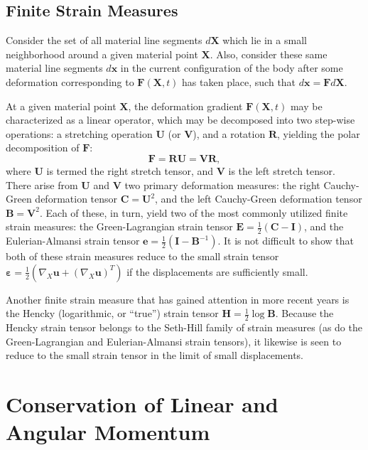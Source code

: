 \subsection{Finite Strain Measures}

Consider the set of all material line segments $d \mathbf{X}$ which lie in a small neighborhood around a given material point $\mathbf{X}$. Also, consider these same material line segments $d \mathbf{x}$ in the current configuration of the body after some deformation corresponding to $\mathbf{F} (\mathbf{X}, t)$ has taken place, such that $d \mathbf{x} = \mathbf{F} d \mathbf{X}$.

At a given material point $\mathbf{X}$, the deformation gradient $\mathbf{F} (\mathbf{X}, t)$ may be characterized as a linear operator, which may be decomposed into two step-wise operations: a stretching operation $\mathbf{U}$ (or $\mathbf{V}$), and a rotation $\mathbf{R}$, yielding the polar decomposition of $\mathbf{F}$:
\begin{equation}
  \mathbf{F} = \mathbf{R} \mathbf{U} = \mathbf{V} \mathbf{R},
\end{equation}
where $\mathbf{U}$ is termed the right stretch tensor, and $\mathbf{V}$ is the left stretch tensor. There arise from $\mathbf{U}$ and $\mathbf{V}$ two primary deformation measures: the right Cauchy-Green deformation tensor $\mathbf{C} = \mathbf{U}^2$, and the left Cauchy-Green deformation tensor $\mathbf{B} = \mathbf{V}^2$. Each of these, in turn, yield two of the most commonly utilized finite strain measures: the Green-Lagrangian strain tensor $\mathbf{E} = \frac{1}{2} (\mathbf{C} - \mathbf{I})$, and the Eulerian-Almansi strain tensor $\mathbf{e} = \frac{1}{2} (\mathbf{I} - \mathbf{B}^{-1})$. It is not difficult to show that both of these strain measures reduce to the small strain tensor $\boldsymbol{\varepsilon} = \frac{1}{2} (\nabla_X \mathbf{u} + (\nabla_X \mathbf{u})^T)$ if the displacements are sufficiently small.

Another finite strain measure that has gained attention in more recent years is the Hencky (logarithmic, or ``true'') strain tensor $\mathbf{H} = \frac{1}{2} \log \mathbf{B}$. Because the Hencky strain tensor belongs to the Seth-Hill family of strain measures (as do the Green-Lagrangian and Eulerian-Almansi strain tensors), it likewise is seen to reduce to the small strain tensor in the limit of small displacements.

\section{Conservation of Linear and Angular Momentum}

